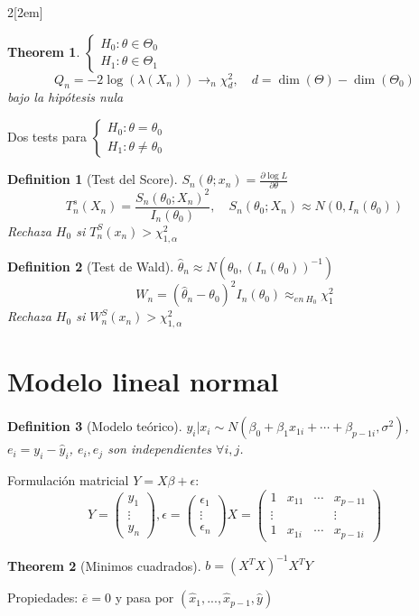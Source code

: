 \documentclass[leqno]{article}
\newtheorem*{theorem}{Theorem}
\newtheorem*{definition}{Definition}
\begin{document}
\begin{multicols}{2}[\columnsep2em]
\begin{theorem} $\begin{cases}
  H_0: \theta \in \Theta_0\\
  H_1:\theta \in \Theta_1
\end{cases}$ 
\[
Q_n = -2\log (\lambda(X_n)) \to _n \chi ^2_d, \quad d=\dim (\Theta)-\dim(\Theta_0)
\] 
bajo la hipótesis nula
\end{theorem}

Dos tests para $\begin{cases}
  H_0:\theta =\theta _0\\ H_1: \theta \neq \theta _0
\end{cases}$

\begin{definition}[Test del Score] $S_n(\theta ;x_n) = \frac{\partial \log L}{\partial \theta }$
\[
T_n^s(X_n) = \frac{S_n(\theta _0;X_n)^2}{I_n(\theta _0)}, \quad S_n(\theta _0;X_n) \approx N(0,I_n(\theta _0))
\] 
Rechaza $H_0$ si  $T_n^S(x_n)>\chi ^2_{1,\alpha} $
\end{definition}

\begin{definition}[Test de Wald] $\hat{\theta }_n \approx N(\theta _0, (I_n(\theta _0))^{-1})$
\[
W_n = (\hat{\theta }_n-\theta _0)^2I_n(\theta _0) \approx_{en \ H_0} \chi ^2_1
\] 
Rechaza $H_0$ si  $W_n^S(x_n)>\chi ^2_{1,\alpha} $
\end{definition}





\section{Modelo lineal normal}

\begin{definition}[Modelo teórico] $y_i|x_i \sim N(\beta _0+ \beta_1x_{1i}+ \cdots + \beta_{p-1i}, \sigma ^2)$, $e_i = y_i-\hat{y}_i$, $e_i, e_j$ son independientes $\forall i, j$.
\end{definition}

Formulación matricial $Y = X\beta + \epsilon$:
\[
Y = \begin{pmatrix} y_1 \\ \vdots \\ y_n \end{pmatrix} , \epsilon = \begin{pmatrix} \epsilon_1\\ \vdots \\ \epsilon_n \end{pmatrix} 
X = \begin{pmatrix} 1 & x_{11} & \cdots & x_{p-11} \\ \vdots & & & \vdots \\ 1 & x_{1i} & \cdots & x_{p-1i} \end{pmatrix} 
\] 
\begin{theorem}[Minimos cuadrados] $ b = (X^TX)^{-1}X^TY$
\end{theorem}
Propiedades: $\overline e = 0$ y pasa por $(\hat x_1, ... , \hat x_{p-1}, \hat y)$


\end{multicols}
\end{document}
